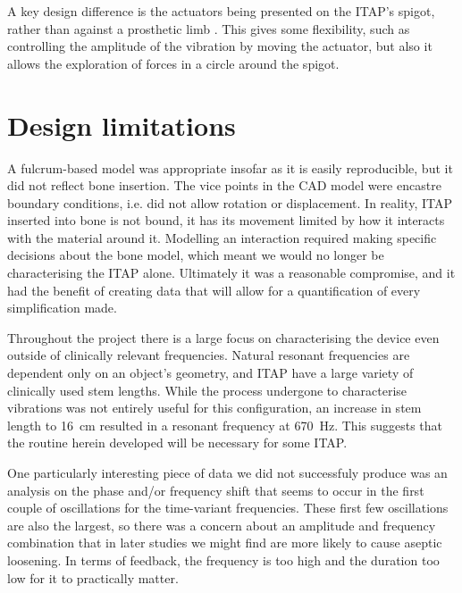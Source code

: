 A key design difference is the actuators being presented on the ITAP's spigot, rather than against a prosthetic limb \cite{haggstrom_vibrotactile_2013,jacobs_evaluation_2000}.
This gives some flexibility, such as controlling the amplitude of the vibration by moving the actuator, but also it allows the exploration of forces in a circle around the spigot.  

\section{Design limitations}
A fulcrum-based model was appropriate insofar as it is easily reproducible, but it did not reflect bone insertion.
The vice points in the CAD model were encastre boundary conditions, i.e. did not allow rotation or displacement.
In reality, ITAP inserted into bone is not bound, it has its movement limited by how it interacts with the material around it.
Modelling an interaction required making specific decisions about the bone model, which meant we would no longer be characterising the ITAP alone.
Ultimately it was a reasonable compromise, and it had the benefit of creating data that will allow for a quantification of every simplification made.

Throughout the project there is a large focus on characterising the device even outside of clinically relevant frequencies.
Natural resonant frequencies are dependent only on an object's geometry, and ITAP have a large variety of clinically used stem lengths.
While the process undergone to characterise vibrations was not entirely useful for this configuration, an increase in stem length to \SI{16}{cm} resulted in a resonant frequency at \SI{670}{Hz}.
This suggests that the routine herein developed will be necessary for some ITAP.

One particularly interesting piece of data we did not successfuly produce was an analysis on the phase and/or frequency shift that seems to occur in the first couple of oscillations for the time-variant frequencies.
These first few oscillations are also the largest, so there was a concern about an amplitude and frequency combination that in later studies we might find are more likely to cause aseptic loosening.
In terms of feedback, the frequency is too high and the duration too low for it to practically matter.